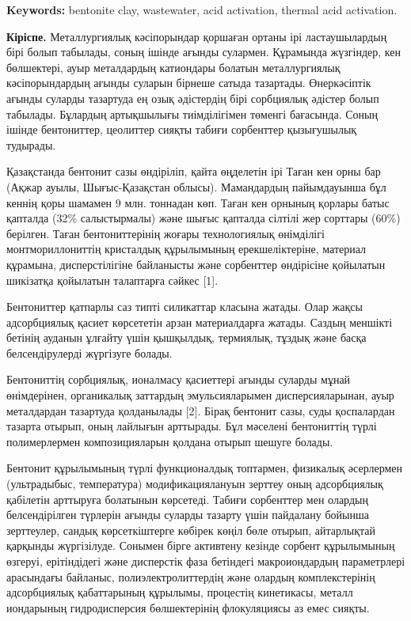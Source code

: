 \textbf{Keywords:} bentonite clay, wastewater, acid activation, thermal
acid activation.

\textbf{Кіріспе.} Металлургиялық кәсіпорындар қоршаған ортаны ірі
ластаушылардың бірі болып табылады, соның ішінде ағынды сулармен.
Құрамында жүзгіндер, кен бөлшектері, ауыр металдардың катиондары болатын
металлургиялық кәсіпорындардың ағынды суларын бірнеше сатыда тазартады.
Өнеркәсіптік ағынды суларды тазартуда ең озық әдістердің бірі сорбциялық
әдістер болып табылады. Бұлардың артықшылығы тиімділігімен төменгі
бағасында. Соның ішінде бентониттер, цеолиттер сияқты табиғи сорбенттер
қызығушылық тудырады.

Қазақстанда бентонит сазы өндіріліп, қайта өңделетін ірі Таған кен орны
бар (Ақжар ауылы, Шығыс-Қазақстан облысы). Мамандардың пайымдауынша бұл
кеннің қоры шамамен 9 млн. тоннадан көп. Таған кен орнының қорлары батыс
қапталда (32\% салыстырмалы) және шығыс қапталда сілтілі жер сорттары
(60\%) берілген. Таған бентониттерінің жоғары технологиялық өнімділігі
монтмориллониттің кристалдық құрылымының ерекшеліктеріне, материал
құрамына, дисперстілігіне байланысты және сорбенттер өндірісіне
қойылатын шикізатқа қойылатын талаптарға сәйкес {[}1{]}.

Бентониттер қатпарлы саз типті силикаттар класына жатады. Олар жақсы
адсорбциялық қасиет көрсететін арзан материалдарға жатады. Саздың
меншікті бетінің ауданын ұлғайту үшін қышқылдық, термиялық, тұздық және
басқа белсендірулерді жүргізуге болады.

Бентониттің сорбциялық, ионалмасу қасиеттері ағынды суларды мұнай
өнімдерінен, органикалық заттардың эмульсияларымен дисперсияларынан,
ауыр металдардан тазартуда қолданылады {[}2{]}. Бірақ бентонит сазы,
суды қоспалардан тазарта отырып, оның лайлығын арттырады. Бұл мәселені
бентониттің түрлі полимерлермен композицияларын қолдана отырып шешуге
болады.

Бентонит құрылымының түрлі функционалдық топтармен, физикалық әсерлермен
(ультрадыбыс, температура) модификациялануын зерттеу оның адсорбциялық
қабілетін арттыруға болатынын көрсетеді. Табиғи сорбенттер мен олардың
белсендірілген түрлерін ағынды суларды тазарту үшін пайдалану бойынша
зерттеулер, сандық көрсеткіштерге көбірек көңіл бөле отырып, айтарлықтай
қарқынды жүргізілуде. Сонымен бірге активтену кезінде сорбент
құрылымының өзгеруі, ерітіндідегі және дисперстік фаза бетіндегі
макроиондардың параметрлері арасындағы байланыс, полиэлектролиттердің
және олардың комплекстерінің адсорбциялық қабаттарының құрылымы,
процестің кинетикасы, металл иондарының гидродисперсия бөлшектерінің
флокуляциясы аз емес сияқты.

